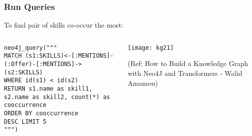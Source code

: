 \begin{frame}[fragile]\frametitle{Run Queries}

To find  pair of skills co-occur the most:

\begin{columns}
    \begin{column}[T]{0.6\linewidth}
		
			\begin{lstlisting}
neo4j_query("""
MATCH (s1:SKILLS)<-[:MENTIONS]-(:Offer)-[:MENTIONS]->(s2:SKILLS)
WHERE id(s1) < id(s2)
RETURN s1.name as skill1, s2.name as skill2, count(*) as cooccurrence
ORDER BY cooccurrence
DESC LIMIT 5
""")
			\end{lstlisting}
    \end{column}
    \begin{column}[T]{0.4\linewidth}
			\begin{center}
			\texttt{[image: kg21]}
			\end{center}	
			
			{\tiny (Ref: How to Build a Knowledge Graph with Neo4J and Transformers - Walid Amamou)}	
    \end{column}			
\end{columns}
			
\end{frame}
